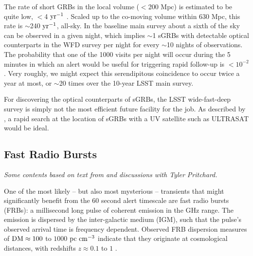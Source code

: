 \documentclass[DM,lsstdraft,authoryear,toc]{lsstdoc}
\begin{document}
The rate of short GRBs in the local volume ($<$200 Mpc) is estimated to be quite low, $<$4 $\rm yr^{-1}$ \citep{2019arXiv190800100M}.
Scaled up to the co-moving volume within 630 Mpc, this rate is $\sim$240 $\rm yr^{-1}$, all-sky.
In the baseline main survey about a sixth of the sky can be observed in a given night, which implies $\sim$1 sGRBs with detectable optical counterparts in the WFD survey per night for every $\sim$10 nights of observations.
The probability that one of the 1000 visits per night will occur during the 5 minutes in which an alert would be useful for triggering rapid follow-up is $<10^{-2}$.
Very roughly, we might expect this serendipitous coincidence to occur twice a year at most, or $\sim$20 times over the 10-year LSST main survey.


For discovering the optical counterparts of sGRBs, the LSST wide-fast-deep survey is simply not the most efficient future facility for the job.
As described by \citet{2018MNRAS.473..576G}, a rapid search at the location of sGRBs with a UV satellite such as ULTRASAT would be ideal.


\subsection{Fast Radio Bursts}\label{ssec:latency_frb}

{\it Some contents based on text from and discussions with Tyler Pritchard.}

One of the most likely -- but also most mysterious -- transients that might significantly benefit from the $60$ second alert timescale are fast radio bursts (FRBs): a millisecond long pulse of coherent emission in the GHz range.
The emission is dispersed by the inter-galactic medium (IGM), such that the pulse's observed arrival time is frequency dependent.
Observed FRB dispersion measures of $\rm{DM}\approx100$ to $1000$ $\rm pc\ cm^{-3}$ indicate that they originate at cosmological distances, with redshifts $z\approx0.1$ to $1$ \citep{2018Natur.562..386S}. 
\end{document}

